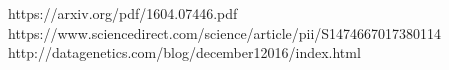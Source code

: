 \newpage
\renewcommand\refname{Список использованных источников}
\begin{thebibliography}{99}
     https://arxiv.org/pdf/1604.07446.pdf
     https://www.sciencedirect.com/science/article/pii/S1474667017380114
     http://datagenetics.com/blog/december12016/index.html
\end{thebibliography}
